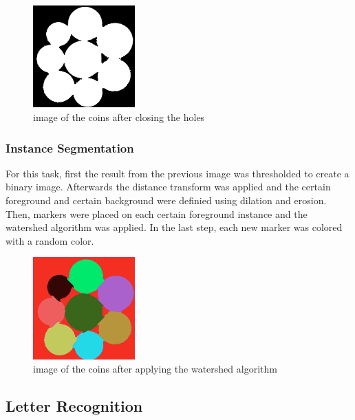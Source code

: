 \documentclass{article}
\begin{document}
    \begin{figure}[H]
        \centering
        \includegraphics[width = 0.35\textwidth]{coins_close.png}
        \caption{image of the coins after closing the holes}
        \label{img:coins_close}
    \end{figure}

    \subsubsection{Instance Segmentation}

    For this task, first the result from the previous image was thresholded to create a binary image. Afterwards the distance transform was applied
    and the certain foreground and certain background were definied using dilation and erosion.
    Then, markers were placed on each certain foreground instance and the watershed algorithm was applied. In the last step,
    each new marker was colored with a random color.

    \begin{figure}[H]
        \centering
        \includegraphics[width = 0.35\textwidth]{coins_instances.png}
        \caption{image of the coins after applying the watershed algorithm}
        \label{img:coins_instances}
    \end{figure}

    \pagebreak

    \subsection{Letter Recognition}
\end{document}
